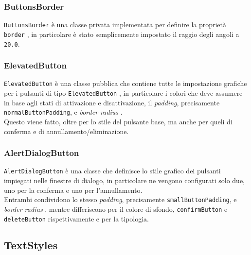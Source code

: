 \subsubsection*{ButtonsBorder}
\label{subsubsec:button-border}

\lstinline{ButtonsBorder} è una classe privata implementata per definire la proprietà \lstinline{border} \cite{site:border}, in particolare è stato semplicemente impostato il raggio degli angoli a \lstinline{20.0}.

\subsubsection*{ElevatedButton}
\label{subsubsec:elevated-button}

\lstinline{ElevatedButton} è una classe pubblica che contiene tutte le impostazione grafiche per i pulsanti di tipo \lstinline{ElevatedButton} \cite{site:elevated-button}, in particolare i colori che deve assumere in base agli stati di attivazione e disattivazione, il \emph{padding}, precisamente \lstinline{normalButtonPadding}, e \emph{border radius} \cite{site:border}. \\
Questo viene fatto, oltre per lo stile del pulsante base, ma anche per queli di conferma e di annullamento/eliminazione.

\subsubsection*{AlertDialogButton}
\label{subsubsec:alert-dialog-button}

\lstinline{AlertDialogButton} è una classe che definisce lo stile grafico dei pulsanti impiegati nelle finestre di dialogo, in particolare ne vengono configurati solo due, uno per la conferma e uno per l'annullamento. \\
Entrambi condividono lo stesso \emph{padding}, precisamente \lstinline{smallButtonPadding}, e \emph{border radius} \cite{site:border}, mentre differiscono per il colore di sfondo, \lstinline{confirmButton} e \lstinline{deleteButton} rispettivamente e per la tipologia.

\subsection{TextStyles}
\label{subsec:text-styles}

